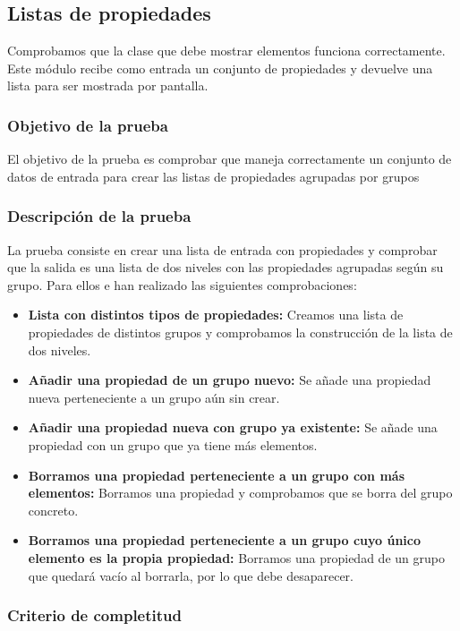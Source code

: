 \bigskip
\subsection{Listas de propiedades}

Comprobamos que la clase que debe mostrar elementos funciona correctamente. Este módulo recibe como entrada un conjunto de propiedades y devuelve una lista para ser mostrada por pantalla.

\subsubsection{Objetivo de la prueba}

El objetivo de la prueba es comprobar que maneja correctamente un conjunto de datos de entrada para crear las listas de propiedades agrupadas por grupos

\subsubsection{Descripción de la prueba}

La prueba consiste en crear una lista de entrada con propiedades y comprobar que la salida es una lista de dos niveles con las propiedades agrupadas según su grupo. Para ellos e han realizado las siguientes comprobaciones:

\begin{itemize}
  \item \textbf{Lista con distintos tipos de propiedades:} Creamos una lista de propiedades de distintos grupos y comprobamos la construcción de la lista de dos niveles.
  \item \textbf{Añadir una propiedad de un grupo nuevo:} Se añade una propiedad nueva perteneciente a un grupo aún sin crear.
  \item \textbf{Añadir una propiedad nueva con grupo ya existente:} Se añade una propiedad con un grupo que ya tiene más elementos.
  \item \textbf{Borramos una propiedad perteneciente a un grupo con más elementos:} Borramos una propiedad y comprobamos que se borra del grupo concreto.
  \item \textbf{Borramos una propiedad perteneciente a un grupo cuyo único elemento es la propia propiedad:} Borramos una propiedad de un grupo que quedará vacío al borrarla, por lo que debe desaparecer.   
\end{itemize}

\subsubsection{Criterio de completitud}

